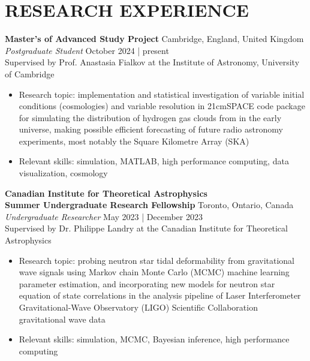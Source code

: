 \documentclass[a4paper,10pt]{extarticle}
\begin{document}
\section*{RESEARCH EXPERIENCE}
\textbf{Master's of Advanced Study Project} \hfill Cambridge, England, United Kingdom\\
\textit{Postgraduate Student} \hfill October 2024 | present\\
Supervised by Prof. Anastasia Fialkov at the Institute of Astronomy, University of Cambridge
\begin{itemize}
    \item Research topic: implementation and statistical investigation of variable initial conditions (cosmologies) and variable resolution in 21cmSPACE code package for simulating the distribution of hydrogen gas clouds from in the early universe, making possible efficient forecasting of future radio astronomy experiments, most notably the Square Kilometre Array (SKA)
    
    \item Relevant skills: simulation, MATLAB, high performance computing, data visualization, cosmology
\end{itemize}

\textbf{Canadian Institute for Theoretical Astrophysics\\
    Summer Undergraduate Research Fellowship} \hfill Toronto, Ontario, Canada\\
\textit{Undergraduate Researcher} \hfill May 2023 | December 2023\\
Supervised by Dr. Philippe Landry at the Canadian Institute for Theoretical Astrophysics
\begin{itemize}
    \item Research topic: probing neutron star tidal deformability from gravitational wave signals using Markov chain Monte Carlo (MCMC) machine learning parameter estimation, and incorporating new models for neutron star equation of state correlations in the analysis pipeline of Laser Interferometer Gravitational-Wave Observatory (LIGO) Scientific Collaboration gravitational wave data

    \item Relevant skills: simulation, MCMC, Bayesian inference, high performance computing
\end{itemize}
\end{document}
